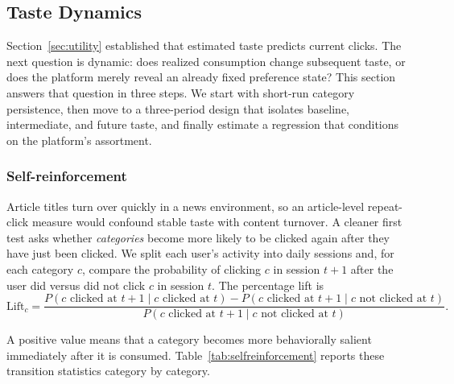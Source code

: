 \documentclass[11pt]{article}
\begin{document}
\subsection{Taste Dynamics}
\label{sec:taste}

Section~\ref{sec:utility} established that estimated taste predicts current clicks. The next question is dynamic: does realized consumption change subsequent taste, or does the platform merely reveal an already fixed preference state? This section answers that question in three steps. We start with short-run category persistence, then move to a three-period design that isolates baseline, intermediate, and future taste, and finally estimate a regression that conditions on the platform's assortment.

\subsubsection{Self-reinforcement}

Article titles turn over quickly in a news environment, so an article-level repeat-click measure would confound stable taste with content turnover. A cleaner first test asks whether \emph{categories} become more likely to be clicked again after they have just been clicked. We split each user's activity into daily sessions and, for each category $c$, compare the probability of clicking $c$ in session $t+1$ after the user did versus did not click $c$ in session $t$. The percentage lift is
\[
\text{Lift}_c =
\frac{
P(c\text{ clicked at }t{+}1 \mid c\text{ clicked at }t)
-
P(c\text{ clicked at }t{+}1 \mid c\text{ not clicked at }t)
}{
P(c\text{ clicked at }t{+}1 \mid c\text{ not clicked at }t)
}.
\]

A positive value means that a category becomes more behaviorally salient immediately after it is consumed. Table~\ref{tab:selfreinforcement} reports these transition statistics category by category.
\end{document}
